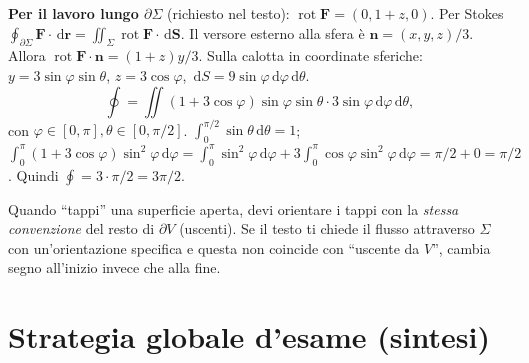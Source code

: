 \documentclass[11pt,a4paper,openany]{book}
\theoremstyle{plain}
\theoremstyle{definition}
\theoremstyle{remark}
\newcommand{\dd}{\,\mathrm{d}}
\newcommand{\Rot}{\operatorname{rot}}
\renewcommand{\vec}[1]{\mathbf{#1}}
\newcommand{\F}{\mathbf{F}}
\newcommand{\rr}{\mathbf{r}}
\begin{document}
\begin{esempio}[title={23/1/2023 --- Esercizio 3, schema generale}]
\textbf{Per il lavoro lungo $\partial\Sigma$} (richiesto nel testo):
$\Rot\F=(0,1+z,0)$. Per Stokes
$\oint_{\partial\Sigma}\F\cdot\dd\rr=\iint_\Sigma\Rot\F\cdot\dd\vec S$.
Il versore esterno alla sfera \`e $\vec n=(x,y,z)/3$. Allora
$\Rot\F\cdot\vec n=(1+z)y/3$. Sulla calotta in coordinate sferiche:
$y=3\sin\varphi\sin\theta$, $z=3\cos\varphi$, $\dd S=9\sin\varphi\dd\varphi\dd\theta$.
\[
\oint=\iint(1+3\cos\varphi)\sin\varphi\sin\theta\cdot 3\sin\varphi\dd\varphi\dd\theta,
\]
con $\varphi\in[0,\pi],\theta\in[0,\pi/2]$.
$\int_0^{\pi/2}\sin\theta\dd\theta=1$;
$\int_0^\pi(1+3\cos\varphi)\sin^2\varphi\dd\varphi=
\int_0^\pi\sin^2\varphi\dd\varphi+3\int_0^\pi\cos\varphi\sin^2\varphi\dd\varphi
=\pi/2+0=\pi/2$. Quindi $\oint=3\cdot\pi/2=3\pi/2$.
\end{esempio}

\begin{trappola}
Quando ``tappi'' una superficie aperta, devi orientare i tappi con la
\emph{stessa convenzione} del resto di $\partial V$ (uscenti). Se il
testo ti chiede il flusso attraverso $\Sigma$ con un'orientazione
specifica e questa non coincide con ``uscente da $V$'', cambia segno
all'inizio invece che alla fine.
\end{trappola}

\section{Strategia globale d'esame (sintesi)}
\end{document}
